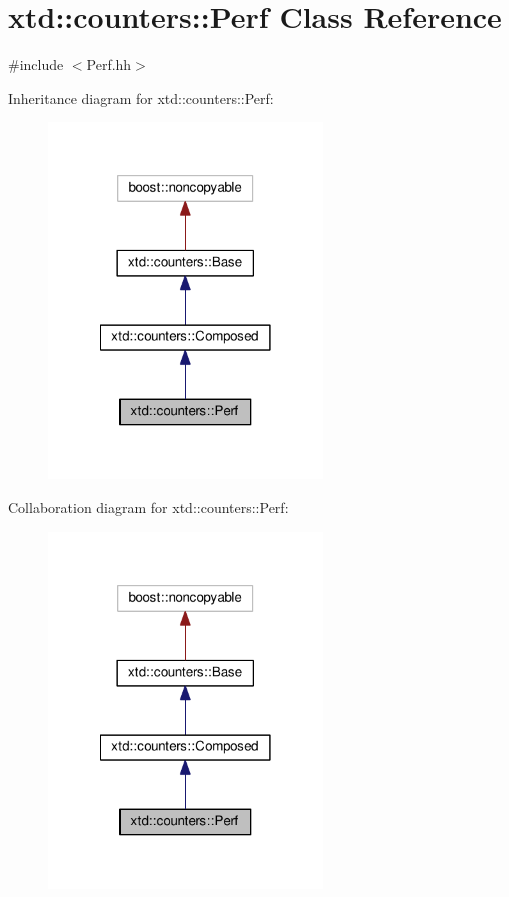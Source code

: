 \hypertarget{classxtd_1_1counters_1_1Perf}{\section{xtd\-:\-:counters\-:\-:Perf Class Reference}
\label{classxtd_1_1counters_1_1Perf}
}


{\ttfamily \#include $<$Perf.\-hh$>$}



Inheritance diagram for xtd\-:\-:counters\-:\-:Perf\-:
\nopagebreak
\begin{figure}[H]
\begin{center}
\leavevmode
\includegraphics[width=206pt]{classxtd_1_1counters_1_1Perf__inherit__graph}
\end{center}
\end{figure}


Collaboration diagram for xtd\-:\-:counters\-:\-:Perf\-:
\nopagebreak
\begin{figure}[H]
\begin{center}
\leavevmode
\includegraphics[width=206pt]{classxtd_1_1counters_1_1Perf__coll__graph}
\end{center}
\end{figure}
